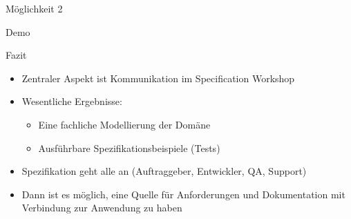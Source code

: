 \begin{frame}{Möglichkeit 2}

\begin{center}
\Large
Demo
\end{center}


\end{frame}

\begin{frame}{Fazit}

\begin{itemize}
	\item Zentraler Aspekt ist Kommunikation im Specification Workshop
	\item Wesentliche Ergebnisse:
	\begin{itemize}
		\item Eine fachliche Modellierung der Domäne
		\item Ausführbare Spezifikationsbeispiele (Tests)
	\end{itemize}
	\item Spezifikation geht alle an (Auftraggeber, Entwickler, QA, Support)
	\item Dann ist es möglich, eine Quelle für Anforderungen und Dokumentation mit Verbindung zur Anwendung zu haben
\end{itemize}

\end{frame}

